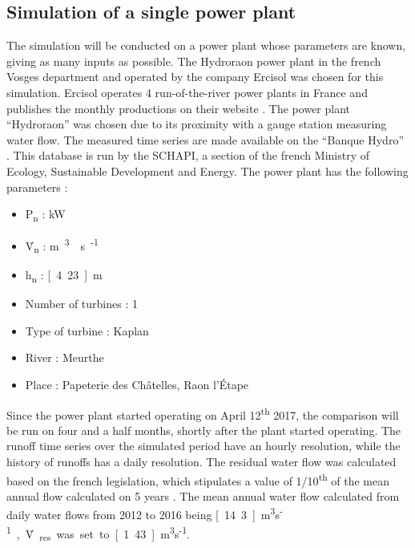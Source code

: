 \subsection{Simulation of a single power plant}
\label{sub:metho_single}
The simulation will be conducted on a power plant whose parameters are known, giving as many inputs as possible. The Hydroraon power plant in the french Vosges department and operated by the company Ercisol was chosen for this simulation. Ercisol operates 4 run-of-the-river power plants in France and publishes the monthly productions on their website \cite{ercisol}. The power plant ``Hydroraon'' was chosen due to its proximity with a gauge station measuring water flow. The measured time series are made available on the ``Banque Hydro'' \cite{eaufrance}. This database is run by the SCHAPI, a section of the french Ministry of Ecology, Sustainable Development and Energy. \newline
The power plant has the following parameters :
\begin{itemize}
\itemsep0em
 \item P\textsubscript{n} \tabto{4cm}: \unit[400]{kW}
 \item \.V\textsubscript{n} \tabto{4cm}: \unit[12]{m\textsuperscript{3}\textperiodcentered s\textsuperscript{-1}}
 \item h\textsubscript{n} \tabto{4cm}: \unit[4.23]{m}
 \item Number of turbines \tabto{4cm}: 1
 \item Type of turbine \tabto{4cm}: Kaplan
 \item River \tabto{4cm}: Meurthe
 \item Place \tabto{4cm}: Papeterie des Châtelles, Raon l'Étape
\end{itemize}
Since the power plant started operating on April 12\textsuperscript{th} 2017, the comparison will be run on four and a half months, shortly after the plant started operating. The runoff time series over the simulated period have an hourly resolution, while the history of runoffs has a daily resolution. The residual water flow was calculated based on the french legislation, which stipulates a value of 1/10\textsuperscript{th} of the mean annual flow calculated on 5 years \cite{sage}. The mean annual water flow calculated from daily water flows from 2012 to 2016 being \unit[14.3]{m\textsuperscript{3}\textperiodcentered s\textsuperscript{-1}}, \.V\textsubscript{res} was set to \unit[1.43]{m\textsuperscript{3}\textperiodcentered s\textsuperscript{-1}}.

